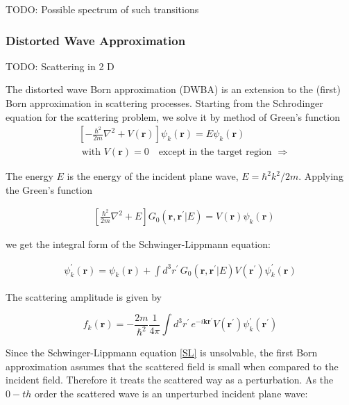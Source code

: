 TODO: Possible spectrum of such transitions

\subsubsection{Distorted Wave Approximation}


TODO: Scattering in 2 D

The distorted wave Born approximation (DWBA) is an extension to the (first) Born approximation in scattering processes. Starting from the Schrodinger equation for the scattering problem, we solve it by method of Green's function
\begin{equation}
\begin{split}
& \left[-\frac{\hbar^2}{2m}\nabla^2 + V(\mathbf{r})\right]\psi_k(\mathbf{r}) = E \psi_k(\mathbf{r}) \\[.8em]
& \text{ with } V(\mathbf{r}) = 0 \,\,\,\,\text{ except in the target region }  \Longrightarrow
\end{split}
\end{equation}

The energy $ E $ is the energy of the incident plane wave, $ E = \hbar^2k^2/2m $.  Applying the Green's function

\begin{equation}
\begin{split}
& \left[\frac{\hbar^2}{2m}\nabla^2 + E \right]G_0(\mathbf{r}, \mathbf{r}^{'} | E) = V(\mathbf{r}) \psi_k(\mathbf{r}) 
\end{split}
\end{equation}

we get the integral form of the Schwinger-Lippmann equation:

\begin{equation}\label{SL}
\begin{split}
\psi^{'}_k(\mathbf{r}) = \psi_k(\mathbf{r}) + \int{d^3r^{'}\,G_0(\mathbf{r}, \mathbf{r}^{'}| E)V(\mathbf{r}^{'})\psi^{'}_k(\mathbf{r})}
\end{split}
\end{equation}

The scattering amplitude is given by \cite{DWBA}

\begin{equation}\label{fsc}
f_k(\mathbf{r}) = -\frac{2m}{\hbar^2}\frac{1}{4\pi}\int{d^3r^{'}\,e^{-i\mathbf{k}\mathbf{r}^{'}}V(\mathbf{r}^{'})\psi^{'}_k(\mathbf{r}^{'})}
\end{equation}

Since the Schwinger-Lippmann equation \eqref{SL} is unsolvable, the first Born approximation assumes that the scattered field is small when compared to the incident field. Therefore it treats the scattered way as a perturbation. As the $ 0 - th $ order the scattered wave is an unperturbed incident plane wave: 

